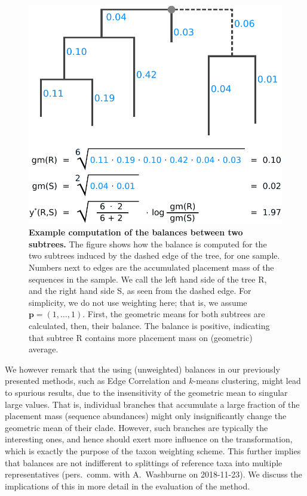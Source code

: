 \begin{figure}[!htb]
    \centering
    \includegraphics[width=0.7\linewidth]{pdf/balances.pdf}
    \caption{
        \textbf{Example computation of the balances between two subtrees.}
        The figure shows how the balance is computed for the two subtrees induced by the dashed edge of the tree,
        for one sample.
        Numbers next to edges are the accumulated placement mass of the sequences in the sample.
        We call the left hand side of the tree R, and the right hand side S, as seen from the dashed edge.
        For simplicity, we do not use weighting here; that is, we assume $\bm{p} = ( 1, \ldots, 1 )$.
        First, the geometric means for both subtrees are calculated, then, their balance.
        The balance is positive, indicating that subtree R contains more placement mass on (geometric) average.
    }
    \label{fig:balances}
\end{figure}

We however remark that the using (unweighted) balances in our previously presented methods,
such as Edge Correlation and $k$-means clustering,
might lead to spurious results, due to the insensitivity of the geometric mean to singular large values.
That is, individual branches that accumulate a large fraction of the placement mass (sequence abundances)
might only insignificantly change the geometric mean of their clade.
However, such branches are typically the interesting ones,
and hence should exert more influence on the transformation, which is exactly the purpose of the taxon weighting scheme.
This further implies that
balances are not indifferent to splittings of reference taxa into multiple representatives
(pers.~comm. with A.~Washburne on 2018-11-23).
We discuss the implications of this in more detail in the evaluation of the method.

